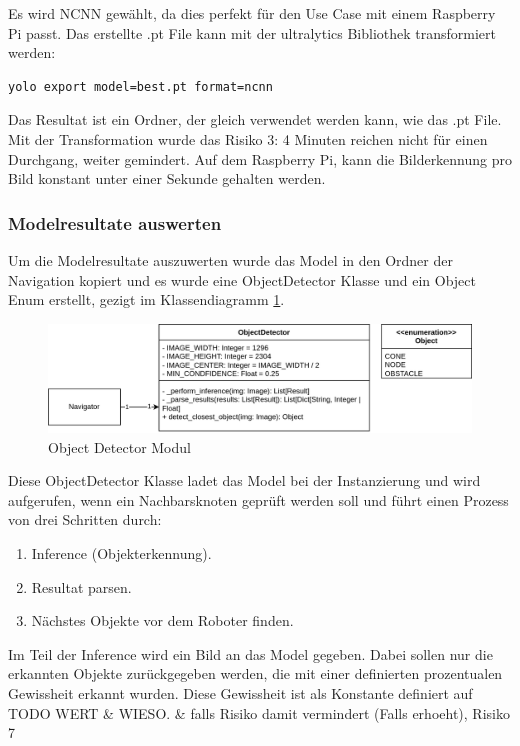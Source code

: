Es wird NCNN gewählt, da dies perfekt für den Use Case mit einem Raspberry Pi passt. Das erstellte .pt File kann mit der ultralytics Bibliothek transformiert werden:

\begin{verbatim}
yolo export model=best.pt format=ncnn
\end{verbatim}

Das Resultat ist ein Ordner, der gleich verwendet werden kann, wie das .pt File. Mit der Transformation wurde das Risiko 3: 4 Minuten reichen nicht für einen Durchgang, weiter gemindert. Auf dem Raspberry Pi, kann die Bilderkennung pro Bild konstant unter einer Sekunde gehalten werden.

\subsubsection{Modelresultate auswerten}
\label{model-results}

Um die Modelresultate auszuwerten wurde das Model in den Ordner der Navigation kopiert und es wurde eine ObjectDetector Klasse und ein Object Enum erstellt, gezigt im Klassendiagramm \ref{fig:nav-object-detector}.

 \begin{figure}[H]
\centering
\includegraphics[width= \textwidth ]{assets/IT/robot-sw-architecture-object-detector.png}
\caption{Object Detector Modul}
\label{fig:nav-object-detector}
\end{figure}

Diese ObjectDetector Klasse ladet das Model bei der Instanzierung und wird aufgerufen, wenn ein Nachbarsknoten geprüft werden soll und führt einen Prozess von drei Schritten durch:

\begin{enumerate}
    \item Inference (Objekterkennung).
    \item Resultat parsen.
    \item Nächstes Objekte vor dem Roboter finden.
\end{enumerate}

Im Teil der Inference wird ein Bild an das Model gegeben. Dabei sollen nur die erkannten Objekte zurückgegeben werden, die mit einer definierten prozentualen Gewissheit erkannt wurden. Diese Gewissheit ist als Konstante definiert auf TODO WERT \& WIESO. \& falls Risiko damit vermindert (Falls erhoeht), Risiko 7

